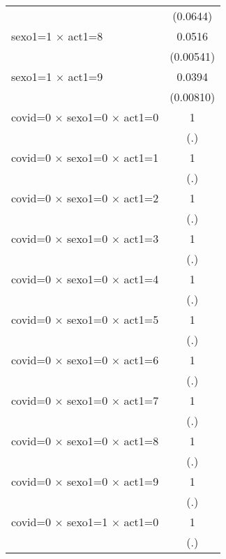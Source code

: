 {\begin{tabular}{l*{1}{c}}
                    &    (0.0644)         \\
[1em]
sexo1=1 $\times$ act1=8&      0.0516\sym{***}\\
                    &   (0.00541)         \\
[1em]
sexo1=1 $\times$ act1=9&      0.0394\sym{***}\\
                    &   (0.00810)         \\
[1em]
covid=0 $\times$ sexo1=0 $\times$ act1=0&           1         \\
                    &         (.)         \\
[1em]
covid=0 $\times$ sexo1=0 $\times$ act1=1&           1         \\
                    &         (.)         \\
[1em]
covid=0 $\times$ sexo1=0 $\times$ act1=2&           1         \\
                    &         (.)         \\
[1em]
covid=0 $\times$ sexo1=0 $\times$ act1=3&           1         \\
                    &         (.)         \\
[1em]
covid=0 $\times$ sexo1=0 $\times$ act1=4&           1         \\
                    &         (.)         \\
[1em]
covid=0 $\times$ sexo1=0 $\times$ act1=5&           1         \\
                    &         (.)         \\
[1em]
covid=0 $\times$ sexo1=0 $\times$ act1=6&           1         \\
                    &         (.)         \\
[1em]
covid=0 $\times$ sexo1=0 $\times$ act1=7&           1         \\
                    &         (.)         \\
[1em]
covid=0 $\times$ sexo1=0 $\times$ act1=8&           1         \\
                    &         (.)         \\
[1em]
covid=0 $\times$ sexo1=0 $\times$ act1=9&           1         \\
                    &         (.)         \\
[1em]
covid=0 $\times$ sexo1=1 $\times$ act1=0&           1         \\
                    &         (.)         \\
[1em]

\end{tabular}}

